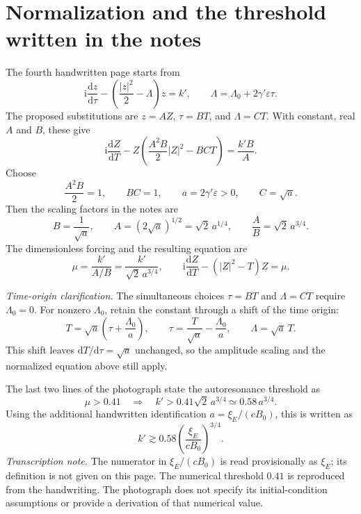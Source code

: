 \documentclass[11pt,a4paper]{article}
\newcommand{\dd}{\mathrm{d}}
\begin{document}
\section{Normalization and the threshold written in the notes}
The fourth handwritten page starts from
\begin{equation}
\mathrm{i}\frac{\dd z}{\dd\tau}
-\left(\frac{|z|^2}{2}-\Lambda\right)z=k',
\qquad \Lambda=\Lambda_0+2\gamma'\varepsilon\tau.
\end{equation}
The proposed substitutions are $z=AZ$, $\tau=BT$, and $\Lambda=CT$.
With constant, real $A$ and $B$, these give
\begin{equation}
\mathrm{i}\frac{\dd Z}{\dd T}
-Z\left(\frac{A^2B}{2}|Z|^2-BCT\right)=\frac{k'B}{A}.
\end{equation}
Choose
\begin{equation}
\frac{A^2B}{2}=1,\qquad BC=1,
\qquad a=2\gamma'\varepsilon>0,\qquad C=\sqrt a.
\end{equation}
Then the scaling factors in the notes are
\begin{equation}
B=\frac{1}{\sqrt a},\qquad
A=(2\sqrt a)^{1/2}=\sqrt{2}\,a^{1/4},\qquad
\frac{A}{B}=\sqrt{2}\,a^{3/4}.
\end{equation}
The dimensionless forcing and the resulting equation are
\begin{equation}
\mu=\frac{k'}{A/B}=\frac{k'}{\sqrt{2}\,a^{3/4}},
\qquad
\boxed{\mathrm{i}\frac{\dd Z}{\dd T}-(|Z|^2-T)Z=\mu.}
\end{equation}

\textit{Time-origin clarification.} The simultaneous choices $\tau=BT$
and $\Lambda=CT$ require $\Lambda_0=0$. For nonzero $\Lambda_0$, retain
the constant through a shift of the time origin:
\begin{equation}
\boxed{T=\sqrt a\left(\tau+\frac{\Lambda_0}{a}\right),\qquad
\tau=\frac{T}{\sqrt a}-\frac{\Lambda_0}{a},\qquad
\Lambda=\sqrt a\,T.}
\end{equation}
This shift leaves $\dd T/\dd\tau=\sqrt a$ unchanged, so the amplitude
scaling and the normalized equation above still apply.

The last two lines of the photograph state the autoresonance threshold as
\begin{equation}
\mu>0.41
\quad\Longrightarrow\quad
k'>0.41\sqrt{2}\,a^{3/4}\simeq0.58\,a^{3/4}.
\end{equation}
Using the additional handwritten identification $a=\xi_E/(cB_0)$,
this is written as
\begin{equation}
\boxed{k'\gtrsim0.58\left(\frac{\xi_E}{cB_0}\right)^{3/4}.}
\end{equation}
\textit{Transcription note.} The numerator in $\xi_E/(cB_0)$ is read
provisionally as $\xi_E$; its definition is not given on this page.
The numerical threshold $0.41$ is reproduced from the handwriting.
The photograph does not specify its initial-condition assumptions or
provide a derivation of that numerical value.
\end{document}
